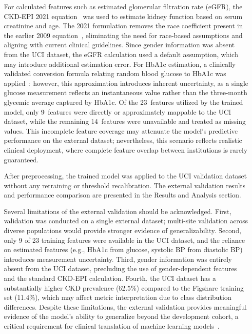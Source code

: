 For calculated features such as estimated glomerular filtration rate (eGFR), the CKD-EPI 2021 equation~\cite{inker2021ckdepi} was used to estimate kidney function based on serum creatinine and age. The 2021 formulation removes the race coefficient present in the earlier 2009 equation~\cite{levey2009ckdepi}, eliminating the need for race-based assumptions and aligning with current clinical guidelines. Since gender information was absent from the UCI dataset, the eGFR calculation used a default assumption, which may introduce additional estimation error. For HbA1c estimation, a clinically validated conversion formula relating random blood glucose to HbA1c was applied~\cite{nathan2008a1c}; however, this approximation introduces inherent uncertainty, as a single glucose measurement reflects an instantaneous value rather than the three-month glycemic average captured by HbA1c. Of the 23~features utilized by the trained model, only 9~features were directly or approximately mappable to the UCI dataset, while the remaining 14~features were unavailable and treated as missing values. This incomplete feature coverage may attenuate the model's predictive performance on the external dataset; nevertheless, this scenario reflects realistic clinical deployment, where complete feature overlap between institutions is rarely guaranteed.

After preprocessing, the trained model was applied to the UCI validation dataset without any retraining or threshold recalibration. The external validation results and performance comparison are presented in the Results and Analysis section.

Several limitations of the external validation should be acknowledged. First, validation was conducted on a single external dataset; multi-site validation across diverse populations would provide stronger evidence of generalizability. Second, only 9 of 23 training features were available in the UCI dataset, and the reliance on estimated features (e.g., HbA1c from glucose, systolic BP from diastolic BP) introduces measurement uncertainty. Third, gender information was entirely absent from the UCI dataset, precluding the use of gender-dependent features and the standard CKD-EPI calculation. Fourth, the UCI dataset has a substantially higher CKD prevalence (62.5\%) compared to the Figshare training set (11.4\%), which may affect metric interpretation due to class distribution differences. Despite these limitations, the external validation provides meaningful evidence of the model's ability to generalize beyond the development cohort, a critical requirement for clinical translation of machine learning models~\cite{steyerberg2019clinical, collins2015tripod}.
